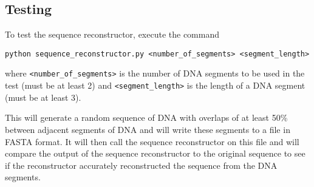 \documentclass{article}
\begin{document}
\subsection{Testing}

To test the sequence reconstructor, execute the command

\vspace{5 mm}

\noindent
\texttt{python sequence\_reconstructor.py <number\_of\_segments> <segment\_length>}

\vspace{5 mm}

\noindent
where \texttt{<number\_of\_segments>} is the number of DNA segments to be used in the test (must be at least 2) and \texttt{<segment\_length>} is the length of a DNA segment (must be at least 3).

This will generate a random sequence of DNA with overlaps of at least 50\% between adjacent segments of DNA and will write these segments to a file in FASTA format. It will then call the sequence reconstructor on this file and will compare the output of the sequence reconstructor to the original sequence to see if the reconstructor accurately reconstructed the sequence from the DNA segments.
\end{document}
